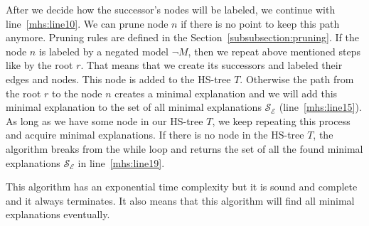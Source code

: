 \documentclass[12pt,a4paper]{article}
\begin{document}
After we decide how the successor's nodes will be labeled, we continue with line~\ref{mhs:line10}. We can prune node $n$ if there is no point to keep this path anymore. Pruning rules are defined in the Section~\ref{subsubsection:pruning}. If the node $n$ is labeled by a negated model $\neg M$, then we repeat above mentioned steps like by the root $r$. That means that we create its successors and labeled their edges and nodes. This node is added to the HS-tree $T$. Otherwise the path from the root $r$ to the node $n$ creates a minimal explanation and we will add this minimal explanation to the set of all minimal explanations $\mathcal{S}_{\mathcal{E}}$ (line~\ref{mhs:line15}). As long as we have some node in our HS-tree $T$, we keep repeating this process and acquire minimal explanations. If there is no node in the HS-tree $T$, the algorithm breaks from the while loop and returns the set of all the found minimal explanations $\mathcal{S}_{\mathcal{E}}$ in line~\ref{mhs:line19}.

This algorithm has an exponential time complexity but it is sound and complete and it always terminates. It also means that this algorithm will find all minimal explanations eventually.
\end{document}
